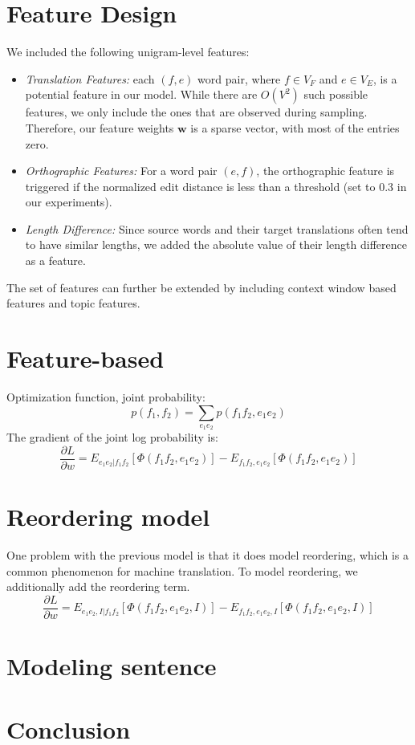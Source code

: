 \section{Feature Design}
\label{sec:feature}
We included the following unigram-level features:
\begin{itemize}
\item \emph{Translation Features:} each $(f, e)$ word pair, where $f  \in V_F $ and $e \in V_E$, is a potential feature in our model. While there are $O(V^2)$ such possible features, we only include the ones that are observed during sampling. 
Therefore, our feature weights $\mathbf{w}$ is a sparse vector, with most of the entries zero.
\item \emph{Orthographic Features:} 
For a word pair $(e, f)$, the orthographic feature is triggered if the normalized edit distance is less than a threshold (set to 0.3 in our experiments).
\item \emph{Length Difference:} Since source words and their target translations often tend to have similar lengths, we added the absolute value of their length difference as a feature. 
\end{itemize}
The set of features can further be extended by including context window based features and topic features.

\section{Feature-based}
Optimization function, joint probability:
$$p(f_1,f_2) = \sum_{e_1e_2}p(f_1f_2,e_1e_2)$$
The gradient of the joint log probability is:
$$\frac{\partial L}{\partial w} = E_{e_1e_2|f_1f_2}[\Phi(f_1f_2,e_1e_2)] - E_{f_1f_2,e_1e_2}[\Phi(f_1f_2,e_1e_2)]$$
\section{Reordering model}
One problem with the previous model is that it does model reordering, which is a common phenomenon for machine translation. To model reordering, we additionally add the reordering term.
$$\frac{\partial L}{\partial w} = E_{e_1e_2, I|f_1f_2}[\Phi(f_1f_2,e_1e_2, I)] - E_{f_1f_2,e_1e_2, I}[\Phi(f_1f_2,e_1e_2,I)]$$
\section{Modeling sentence}

\section{Conclusion}
